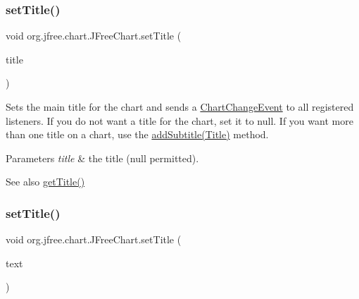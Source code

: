 \subsubsection{\texorpdfstring{set\+Title()}{setTitle()}\hspace{0.1cm}{\footnotesize\ttfamily [1/2]}}
{\footnotesize\ttfamily void org.\+jfree.\+chart.\+J\+Free\+Chart.\+set\+Title (\begin{DoxyParamCaption}\item[{\mbox{\hyperlink{classorg_1_1jfree_1_1chart_1_1title_1_1_text_title}{Text\+Title}}}]{title }\end{DoxyParamCaption})}

Sets the main title for the chart and sends a \mbox{\hyperlink{}{Chart\+Change\+Event}} to all registered listeners. If you do not want a title for the chart, set it to {\ttfamily null}. If you want more than one title on a chart, use the \mbox{\hyperlink{classorg_1_1jfree_1_1chart_1_1_j_free_chart_a511d69d8b64444f31c59761a1c7ba8f8}{add\+Subtitle(\+Title)}} method.


\begin{DoxyParams}{Parameters}
{\em title} & the title ({\ttfamily null} permitted).\\
\hline
\end{DoxyParams}
\begin{DoxySeeAlso}{See also}
\mbox{\hyperlink{classorg_1_1jfree_1_1chart_1_1_j_free_chart_a4874b3d8f2ebef141b31764ff698fa05}{get\+Title()}} 
\end{DoxySeeAlso}
\mbox{\label{classorg_1_1jfree_1_1chart_1_1_j_free_chart_a69d0680abdcd52c2e9967496284bdae6}} 
\subsubsection{\texorpdfstring{set\+Title()}{setTitle()}\hspace{0.1cm}{\footnotesize\ttfamily [2/2]}}
{\footnotesize\ttfamily void org.\+jfree.\+chart.\+J\+Free\+Chart.\+set\+Title (\begin{DoxyParamCaption}\item[{String}]{text }\end{DoxyParamCaption})}

